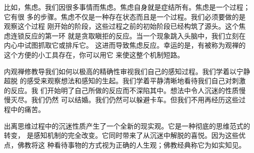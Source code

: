 比如，焦虑。我们因很多事情而焦虑。焦虑自身就是症结所有。焦虑是一个过程；它有很
多的步骤。焦虑不仅是一种存在状态而且是一个过程。我们必须要做的是观察这个过程
刚开始的阶段，这些过程之前的初始阶段已经构筑了源头。这个焦虑连锁反应的第一环
就是贪取瞋拒的反应。当一个现象跳入头脑中，我们立刻在内心中试图抓取它或排斥它。
这进而导致焦虑反应。幸运的是，有被称为观禅的这个方便的小工具存在，你可以用它
来使这整个机制短路。

内观禅修教导我们如何以极高的精确性审视我们自己的感知过程。我们学着以宁静超脱
的感受来观察想法和感知的生起。我们学着平静清晰地看待我们自己对刺激的反应。我
们开始明了自己所做的反应而不深陷其中。想法中令人沉迷的性质慢慢灭尽。我们仍然
可以结婚。我们仍然可以躲避卡车。但我们不用再经历这些过程中的痛苦。

出离思维过程中的沉迷性质产生了一个全新的现实观。它是一种彻底的思维范式的转变，
是感知机制的完全改变。它同时带来了从沉迷中解脱的喜悦。因为这些优点，佛教将这
种看待事物的方式视为正确的人生观；佛教经典称它为如实知见。


\endchapter

\byebye
